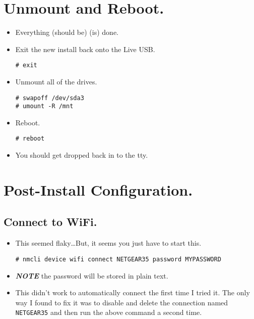\documentclass{article}
\begin{document}
\section{Unmount and Reboot.}
  \begin{itemize}
    \item Everything (should be) (is) done.
    \item Exit the new install back onto the Live USB.
\begin{verbatim}
# exit
\end{verbatim}
  \item Unmount all of the drives.
\begin{verbatim}
# swapoff /dev/sda3
# umount -R /mnt
\end{verbatim}
  \item Reboot.
\begin{verbatim}
# reboot
\end{verbatim}
    \item You should get dropped back in to the tty.
  \end{itemize}

\section{Post-Install Configuration.}
  \subsection{Connect to WiFi.}
    \begin{itemize}
      \item This seemed flaky\ldots But, it seems you just have to start this.
\begin{verbatim}
# nmcli device wifi connect NETGEAR35 password MYPASSWORD
\end{verbatim}
      \item \textbf{\emph{NOTE}} the password will be stored in plain text.
      \item This didn't work to automatically connect the first time I tried it.
        The only way I found to fix it was to disable and delete the connection
        named \verb|NETGEAR35| and then run the above command a second time.
    \end{itemize}
\end{document}
